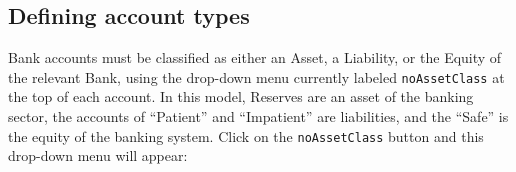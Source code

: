 \begin{center}
\end{center}

\subsection{Defining account types}

Bank accounts must be classified as either an Asset, a Liability, or
the Equity of the relevant Bank, using the drop-down menu currently
labeled {\tt noAssetClass} at the top of each account. In
this model, Reserves are an asset of the banking sector, the accounts
of ``Patient'' and ``Impatient'' are liabilities, and the ``Safe'' is
the equity of the banking system. Click on the
{\tt noAssetClass} button and this drop-down menu will
appear:

\begin{center}
\end{center}

